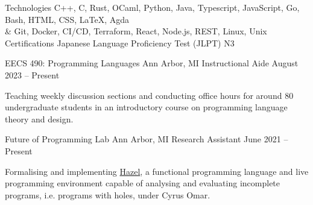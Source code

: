 \documentclass[letterpaper,11pt]{article}
\begin{document}
  \begin{rlinelist}
    \rline
      {Technologies}
      {C++, C, Rust, OCaml, Python, Java, Typescript, JavaScript, Go, Bash, HTML, CSS, \LaTeX, Agda \\
        & Git, Docker, CI/CD, Terraform, React, Node.js, REST, Linux, Unix}
    \rline
      {Certifications}
      {Japanese Language Proficiency Test (JLPT) N3}
  \end{rlinelist}

  \begin{rsectionlist}
    \rsectionitem
      {EECS 490: Programming Languages}
      {Ann Arbor, MI}
      {Instructional Aide}
      {August 2023 -- Present}

      Teaching weekly discussion sections and conducting office hours for around 80 undergraduate
      students in an introductory course on programming language theory and design.

    \rsectionitem
      {Future of Programming Lab}
      {Ann Arbor, MI}
      {Research Assistant}
      {June 2021 -- Present}
      
      Formalising and implementing \href{https://hazel.org}{Hazel}, a functional programming
      language and live programming environment capable of analysing and evaluating incomplete
      programs, i.e. programs with holes, under Cyrus Omar.

      \begin{rpointlist}
      \end{rpointlist}



\end{rsectionlist}
\end{document}
